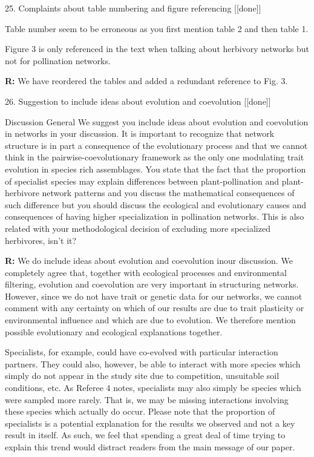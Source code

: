 \documentclass[12pt]{letter}
\newenvironment{refquote}{\bigskip \begin{it}}{\end{it}\smallskip}
\begin{document}
	25. Complaints about table numbering and figure referencing [[done]]

		\begin{refquote}
			Table number seem to be erroneous as you first mention table 2 and then table 1.

			\smallskip

			Figure 3 is only referenced in the text when talking about herbivory networks but not for pollination networks.
		\end{refquote}

		\textbf{R:} We have reordered the tables and added a redundant reference to Fig. 3.


	26. Suggestion to include ideas about evolution and coevolution [[done]]

		\begin{refquote}
			Discussion
			General
			We suggest you include ideas about evolution and coevolution in networks in your discussion. It is important to recognize that network structure is in part a consequence of the evolutionary process and that we cannot think in the pairwise-coevolutionary framework as the only one modulating trait evolution in species rich assemblages.
			You state that the fact that the proportion of specialist species may explain differences between plant-pollination and plant-herbivore network patterns and you discuss the mathematical consequences of such difference but you should discuss the ecological and evolutionary causes and consequences of having higher specialization in pollination networks. This is also related with your methodological decision of excluding more specialized herbivores, isn't it?
		\end{refquote}

		\textbf{R:} We do include ideas about evolution and coevolution inour discussion. We completely agree that, together with ecological processes and environmental filtering, evolution and coevolution are very important in structuring networks. However, since we do not have trait or genetic data for our networks, we cannot comment with any certainty on which of our results are due to trait plasticity or environmental influence and which are due to evolution. We therefore mention possible evolutionary and ecological explanations together.


		Specialists, for example, could have co-evolved with particular interaction partners. They could also, however, be able to interact with more species which simply do not appear in the study site due to competition, unsuitable soil conditions, etc. As Referee 4 notes, specialists may also simply be species which were sampled more rarely. That is, we may be missing interactions involving these species which actually do occur. Please note that the proportion of specialists is a potential explanation for the results we observed and not a key result in itself. As such, we feel that spending a great deal of time trying to explain this trend would distract readers from the main message of our paper.
\end{document}
